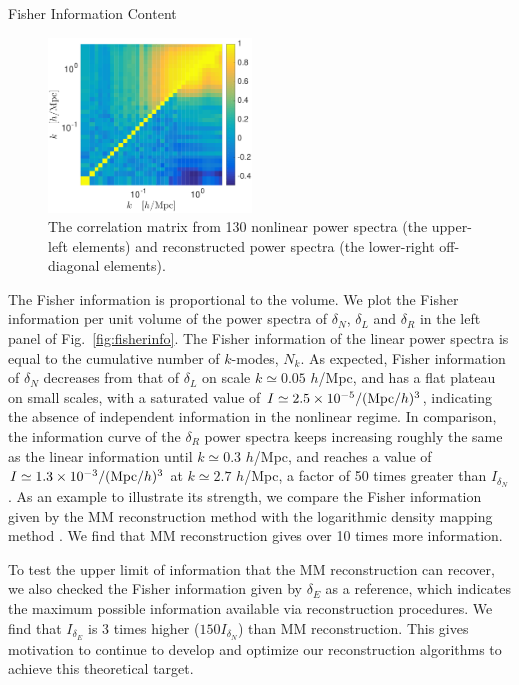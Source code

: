 \begin{section}{Fisher Information Content}
  \begin{figure}
    \centering
    \includegraphics[width=0.48\textwidth]{fig3.pdf}
    \caption{The correlation matrix from 130 nonlinear power
      spectra (the upper-left elements) and reconstructed power
      spectra (the lower-right off-diagonal elements).}
    \label{fig:corrall}
  \end{figure}

  The Fisher information is proportional to the volume. 
  We plot the Fisher information per unit volume of the power spectra of
  $\delta_N$, $\delta_L$ and $\delta_R$ in the left panel of 
  Fig.~\ref{fig:fisherinfo}. The Fisher information of the linear 
  power spectra is equal to the cumulative number of $k$-modes, $N_k$. As expected, Fisher information of
  $\delta_N$ decreases from that of $\delta_L$ on scale
  $k \simeq 0.05$ $h$/Mpc, and has a flat plateau on small scales, 
  with a saturated value of
  $I \simeq 2.5 \times 10^{-5}/({\rm Mpc}/h)^3$, indicating
  the absence of independent information in the nonlinear
  regime.  In comparison, the information curve of the $\delta_R$ power
  spectra keeps increasing roughly the same as the linear information
  until $k\simeq 0.3$ $h$/Mpc, and reaches a value of 
  $I \simeq 1.3 \times 10^{-3}/({\rm Mpc}/h)^3$ at $k \simeq 2.7$ $h$/Mpc,
  a factor of 50 times greater than $I_{\delta_N}$.
  As an example to illustrate its strength, we compare the Fisher information given by the MM reconstruction method
  with the logarithmic density mapping method \cite{bib:Mark2009}. We find that MM
  reconstruction gives over 10 times more information.
  
  To test the upper limit of information that the MM reconstruction can recover, 
  we also checked the Fisher information given by $\delta_E$ \cite{bib:Yu2016} as a reference, 
  which indicates the maximum possible information available via reconstruction procedures.
  We find that $I_{\delta_E}$ is 3 times higher ($150 I_{\delta_N}$) than MM reconstruction.
  This gives motivation to continue to develop and optimize our 
  reconstruction algorithms to achieve this theoretical target.
  

\end{section}
